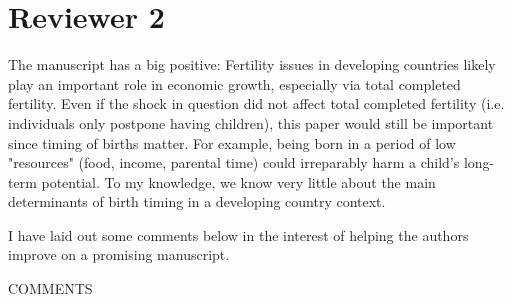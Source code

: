 \documentclass[letterpaper,12pt]{article}
\begin{document}
\newpage

\section*{Reviewer 2}


The manuscript has a big positive: Fertility issues in developing
countries likely play an important role in economic growth, especially
via total completed fertility. Even if the shock in question did not
affect total completed fertility (i.e. individuals only postpone having
children), this paper would still be important since timing of births
matter. For example, being born in a period of low "resources" (food,
income, parental time) could irreparably harm a child's long-term
potential. To my knowledge, we know very little about the main
determinants of birth timing in a developing country context.

I have laid out some comments below in the interest of helping the
authors improve on a promising manuscript.


COMMENTS
\end{document}
